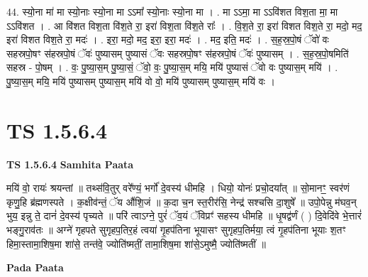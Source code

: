 \documentclass[17pt]{extarticle}
\begin{document}
44. स्यो॒ना मा॑ मा स्यो॒नाः स्यो॒ना मा ऽऽमा᳚ स्यो॒नाः स्यो॒ना मा । . मा ऽऽमा॒ मा ऽऽवि॑शत विश॒ता मा॒ मा ऽऽवि॑शत । . आ वि॑शत विश॒ता वि॑श॒ते रा॒ इरा॑ विश॒ता वि॑श॒ते राः᳚ । . वि॒श॒ते रा॒ इरा॑ विशत विश॒ते रा॒ मदो॒ मद॒ इरा॑ विशत विश॒ते रा॒ मदः॑ । . इरा॒ मदो॒ मद॒ इरा॒ इरा॒ मदः॑ । . मद॒ इति॒ मदः॑ । . स॒ह॒स्र॒पो॒षं ॅवो॑ वः सहस्रपो॒षꣳ स॑हस्रपो॒षं ॅवः॑ पुष्यासम् पुष्यासं ॅवः सहस्रपो॒षꣳ स॑हस्रपो॒षं ॅवः॑ पुष्यासम् । . स॒ह॒स्र॒पो॒षमिति॑ सहस्र - पो॒षम् । . वः॒ पु॒ष्या॒स॒म् पु॒ष्या॒सं॒ ॅवो॒ वः॒ पु॒ष्या॒स॒म् मयि॒ मयि॑ पुष्यासं ॅवो वः पुष्यास॒म् मयि॑ । . पु॒ष्या॒स॒म् मयि॒ मयि॑ पुष्यासम् पुष्यास॒म् मयि॑ वो वो॒ मयि॑ पुष्यासम् पुष्यास॒म् मयि॑ वः । \newline
\pagebreak
{}
\section*{ TS 1.5.6.4 }

\textbf{TS 1.5.6.4 } \newline
\textbf{Samhita Paata} \newline

मयि॑ वो॒ रायः॑ श्रयन्तां ॥ तथ्स॑वि॒तुर् वरे᳚ण्यं॒ भर्गो॑ दे॒वस्य॑ धीमहि । धियो॒ योनः॑ प्रचो॒दया᳚त् ॥ सो॒मानꣳ॒॒ स्वर॑णं कृणु॒हि ब्र॑ह्मणस्पते । क॒क्षीव॑न्तं॒ ॅय औ॑शि॒जं ॥ क॒दा च॒न स्त॒रीर॑सि॒ नेन्द्र॑ सश्चसि दा॒शुषे᳚ ॥ उपो॒पेन्नु म॑घव॒न् भुय॒ इन्नु ते॒ दानं॑ दे॒वस्य॑ पृच्यते ॥ परि॑ त्वाऽग्ने॒ पुरं॑ ॅव॒यं ॅविप्रꣳ॑ सहस्य धीमहि ॥ धृ॒षद्व॑र्णं ( ) दि॒वेदि॑वे भे॒त्तारं॑ भङ्गु॒राव॑तः ॥ अग्ने॑ गृहपते सुगृहप॒तिर॒हं त्वया॑ गृ॒हप॑तिना भूयासꣳ सुगृहप॒तिर्मया॒ त्वं गृ॒हप॑तिना भूयाः श॒तꣳ हिमा॒स्तामा॒शिष॒मा शा॑से॒ तन्त॑वे॒ ज्योति॑ष्मतीं॒ तामा॒शिष॒मा शा॑से॒ऽमुष्मै॒ ज्योति॑ष्मतीं ॥ \newline

\textbf{Pada Paata} \newline
\end{document}
